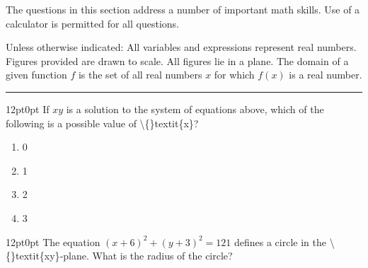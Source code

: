 \documentclass[11pt, twocolumn]{article}
\newcounter{questionnum}
\begin{document}
The questions in this section address a number of important math skills. Use of a calculator is permitted for all questions.

Unless otherwise indicated: All variables and expressions represent real numbers. Figures provided are drawn to scale. All figures lie in a plane. The domain of a given function $f$ is the set of all real numbers $x$ for which $f(x)$ is a real number.
\vspace{8pt}
\hrule
\vspace{8pt}
\twocolumn
\pagestyle{questionpage}

\vspace{6pt}\noindent
\begin{minipage}{\columnwidth}\raggedright
\noindent{}\par\vspace{8pt}
\begin{adjustwidth}{12pt}{0pt}
If $x y$ is a solution to the system of equations above, which of the following is a possible value of \textbackslash\{\}textit\{x\}?
\begin{enumerate}[label=\Alph*),leftmargin=18pt,topsep=3pt,itemsep=2pt]
  \item 0
  \item 1
  \item 2
  \item 3
\end{enumerate}
\end{adjustwidth}
\end{minipage}\par

\vspace{6pt}\noindent
\begin{minipage}{\columnwidth}\raggedright
\noindent{}\par\vspace{8pt}
\begin{adjustwidth}{12pt}{0pt}
The equation $(x + 6 )^{2} + (y + 3 )^{2} = 121$ defines a circle in the \textbackslash\{\}textit\{xy\}‑plane. What is the radius of the circle?
\end{adjustwidth}
\end{minipage}\par
\end{document}
